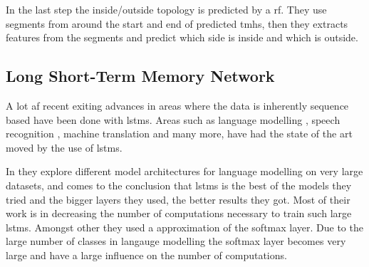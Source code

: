 In the last step the inside/outside topology is predicted by a \gls{rf}. They use segments from around 
the start and end of predicted \glspl{tmh}, then they extracts features from the segments and predict which 
side is inside and which is outside.

\subsection{Long Short-Term Memory Network}

A lot af recent exiting advances in areas where the data is inherently sequence based 
have been done with \glspl{lstm}. Areas such as language modelling \cite{JozefowiczEtAl, ShazeerEtAl},
speech recognition \cite{XiongEtAl}, machine translation \cite{WuEtAl} and many more, have had the 
state of the art moved by the use of \glspl{lstm}. 


In \cite{JozefowiczEtAl} they explore different model architectures for language modelling 
on very large datasets, and comes to the conclusion that \glspl{lstm} is the best of the models
they tried and the bigger layers they used, the better results they got. Most of their work is
in decreasing the number of computations necessary to train such large \glspl{lstm}. 
Amongst other they used a approximation of the softmax layer. Due to the large number of 
classes in langauge modelling the softmax layer becomes very large and have a large influence 
on the number of computations. 